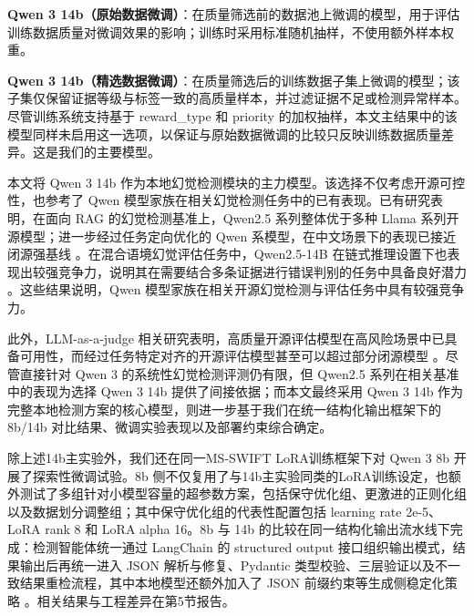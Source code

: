 \documentclass[11pt]{article}
\begin{document}
\textbf{Qwen 3 14b（原始数据微调）}：在质量筛选前的数据池上微调的模型，用于评估训练数据质量对微调效果的影响；训练时采用标准随机抽样，不使用额外样本权重。

\textbf{Qwen 3 14b（精选数据微调）}：在质量筛选后的训练数据子集上微调的模型；该子集仅保留证据等级与标签一致的高质量样本，并过滤证据不足或检测异常样本。尽管训练系统支持基于 reward\_type 和 priority 的加权抽样，本文主结果中的该模型同样未启用这一选项，以保证与原始数据微调的比较只反映训练数据质量差异。这是我们的主要模型。

本文将 Qwen 3 14b 作为本地幻觉检测模块的主力模型。该选择不仅考虑开源可控性，也参考了 Qwen 模型家族在相关幻觉检测任务中的已有表现。已有研究表明，在面向 RAG 的幻觉检测基准上，Qwen2.5 系列整体优于多种 Llama 系列开源模型；进一步经过任务定向优化的 Qwen 系模型，在中文场景下的表现已接近闭源强基线 \citep{jiang2025bianHallucination}。在混合语境幻觉评估任务中，Qwen2.5-14B 在链式推理设置下也表现出较强竞争力，说明其在需要结合多条证据进行错误判别的任务中具备良好潜力 \citep{qi2025mixedContextHallucination}。这些结果说明，Qwen 模型家族在相关开源幻觉检测与评估任务中具有较强竞争力。

此外，LLM-as-a-judge 相关研究表明，高质量开源评估模型在高风险场景中已具备可用性，而经过任务特定对齐的开源评估模型甚至可以超过部分闭源模型 \citep{croxford2025clinicalAISummaries,ravi2024lynxEvaluation}。尽管直接针对 Qwen 3 的系统性幻觉检测评测仍有限，但 Qwen2.5 系列在相关基准中的表现为选择 Qwen 3 14b 提供了间接依据；而本文最终采用 Qwen 3 14b 作为完整本地检测方案的核心模型，则进一步基于我们在统一结构化输出框架下的 8b/14b 对比结果、微调实验表现以及部署约束综合确定。

除上述14b主实验外，我们还在同一MS-SWIFT LoRA训练框架下对 Qwen 3 8b 开展了探索性微调试验。8b 侧不仅复用了与14b主实验同类的LoRA训练设定，也额外测试了多组针对小模型容量的超参数方案，包括保守优化组、更激进的正则化组以及数据划分调整组；其中保守优化组的代表性配置包括 learning rate 2e-5、LoRA rank 8 和 LoRA alpha 16。8b 与 14b 的比较在同一结构化输出流水线下完成：检测智能体统一通过 LangChain 的 structured output 接口组织输出模式，结果输出后再统一进入 JSON 解析与修复、Pydantic 类型校验、三层验证以及不一致结果重检流程，其中本地模型还额外加入了 JSON 前缀约束等生成侧稳定化策略 \citep{chase2023langchain,langchain2024structuredOutput}。相关结果与工程差异在第5节报告。
\end{document}
